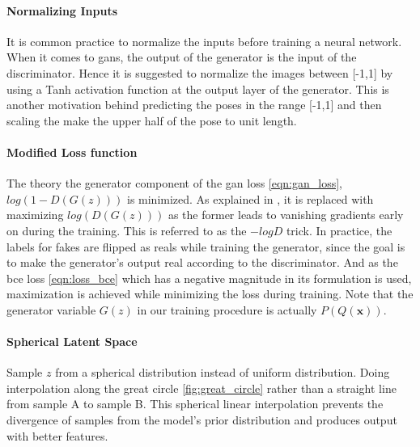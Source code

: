 \paragraph{Normalizing Inputs} 
It is common practice to normalize the inputs before training a neural network. When it comes to \acp{gan}, the output of the generator is the input of the discriminator. Hence it is suggested to normalize the images between [-1,1] by using a Tanh activation function at the output layer of the generator. This is another motivation behind predicting the poses in the range [-1,1] and then scaling the make the upper half of the pose to unit length.

\paragraph{Modified Loss function}
The theory the generator component of the \ac{gan} loss \ref{eqn:gan_loss}, $log(1-D(G(z)))$ is minimized. As explained in , it is replaced with maximizing $log(D(G(z)))$ as the former leads to vanishing gradients early on during the training. This is referred to as the $-logD$ trick. In practice, the labels for fakes are flipped as reals while training the generator, since the goal is to make the generator's output real according to the discriminator. And as the \ac{bce} loss \ref{eqn:loss_bce} which has a negative magnitude in its formulation is used, maximization is achieved while minimizing the loss during training. Note that the generator variable $G(z)$ in our training procedure is actually $P(Q(\textbf{x}))$. 

\paragraph{Spherical Latent Space}
Sample $z$ from a spherical distribution instead of uniform distribution. Doing interpolation along the great circle \ref{fig:great_circle} rather than a straight line from sample A to sample B. This spherical linear interpolation prevents the divergence of samples from the model's prior distribution and produces output with better features.

